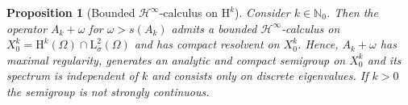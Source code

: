 \documentclass[preprint]{elsarticle}
\newtheorem{prop}[prop]{Proposition}
\numberwithin{equation}{section}
\newcommand {\N}	{\mathbb{N}}
\renewcommand{\H}{\mathrm{H}}
\newcommand{\sigmabar}{\bar{\sigma}}
\renewcommand{\bar}[1]{\overline{#1}}
\newcommand{\rL}{\mathrm{L}}
\newcommand{\rH}{\H}
\newcommand{\btb}{\color{black}}
\newcommand{\etb}{\color{black}}
\begin{document}
\begin{prop}[Bounded $\mathcal{H}^\infty$-calculus on $\rH^k$]\label{prop:mr_2}
	Consider $k \in \N_0$. 
	Then the operator $A_k+\omega$ for $\omega > s(A_k)$ admits a bounded $\mathcal{H}^\infty$-calculus on $X^k_0 = \rH^k(\Omega) \cap \rL^2_{\sigmabar}(\Omega)$
	and has compact resolvent on $X^k_0$. Hence, $A_k+\omega$ has maximal regularity, generates an analytic and compact semigroup on $X^k_0$ and its spectrum is independent of $k$ and consists only on discrete eigenvalues. If $k > 0$ the semigroup is not strongly continuous.  
\end{prop}
\end{document}
